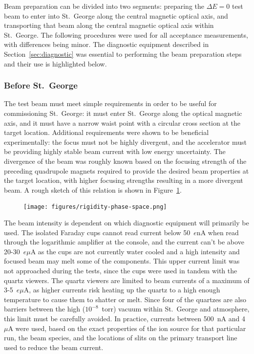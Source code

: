 Beam preparation can be divided into two segments: preparing the $\Delta E = 0$
test beam to enter into St.\ George along the central
magnetic optical axis, and transporting that beam along the central magnetic
optical axis within St.\ George. The following procedures were used for all
acceptance measurements, with differences being minor. The diagnostic equipment
described in Section~\ref{sec:diagnostic} was essential to performing the beam
preparation steps and their use is highlighted below.

\subsubsection{Before St.\ George}

The test beam must meet simple requirements in order to be useful for
commissioning St.\ George: it must enter St.\ George along the optical magnetic
axis, and it must have a narrow waist point with a circular cross section at
the target location. Additional requirements
were shown to be beneficial experimentally: the focus must not be highly
divergent, and the accelerator
must be providing highly stable beam current with low energy uncertainty. The
divergence of the beam was roughly known based on the focusing strength of the
preceding quadrupole magnets required to provide the desired beam properties
at the target location, with higher focusing strengths resulting in a more
divergent beam. A rough sketch of this relation is shown in
Figure~\ref{fig:divergence}.

\begin{figure}[t]
   \begin{center}
       \centerline{\texttt{[image: figures/rigidity-phase-space.png]}}
       \caption[Sketch of beam divergence due to focusing strength]{}
       \label{fig:divergence}
   \end{center}
\end{figure}

The beam intensity is dependent on which diagnostic equipment will primarily be
used. The isolated Faraday cups cannot read current below 50~$e$nA when read
through the logarithmic amplifier at the console,
and the current can't be above 20-30~$e\mu$A
as the cups are not currently water cooled and a high intensity and focused
beam may melt
some of the components. This upper current limit was not approached during the
tests, since the cups were used in tandem with the quartz viewers.
The quartz viewers are limited to
beam currents of a maximum of 3-5~$e\mu$A, as higher currents risk heating up
the quartz to
a high enough temperature to cause them to shatter or melt. Since four of the
quartzes
are also barriers between the high ($10^{-8}$~torr) vacuum within St.\ George
and atmosphere, this limit must be carefully avoided. In practice, currents
between 500~nA and 4~$\mu$A were used, based on the exact properties of the ion
source for that particular run, the beam species, and the locations of slits on
the primary transport line used to reduce the beam current.


